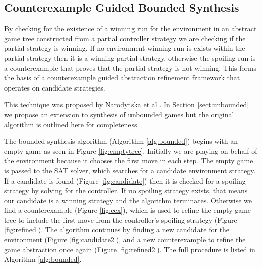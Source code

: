 \documentclass{llncs}
\begin{document}
\subsection{Counterexample Guided Bounded Synthesis}

By checking for the existence of a winning run for the environment in an
abstract game tree constructed from a partial controller strategy we are
checking if the partial strategy is winning. If no environment-winning run is
exists within the partial strategy then it is a winning partial strategy,
otherwise the spoiling run is a counterexample that proves that the partial
strategy is not winning. This forms the basis of a counterexample guided
abstraction refinement framework \cite{clarke2000} that operates on candidate strategies.

This technique was proposed by Narodytska et al \cite{narodytska2014}. In
Section \ref{sect:unbounded} we propose an extension to synthesis of unbounded
games but the original algorithm is outlined here for completeness.

The bounded synthesis algorithm (Algorithm \ref{alg:bounded}) begins with an
empty game as seen in Figure \ref{fig:emptytree}.  Initially we are playing on
behalf of the environment because it chooses the first move in each step.  The
empty game is passed to the SAT solver, which searches for a candidate
environment strategy.  If a candidate is found (Figure \ref{fig:candidate})
then it is checked for a spoiling strategy by solving for the controller.  If
no spoiling strategy exists, that means our candidate is a winning strategy and
the algorithm terminates.  Otherwise we find a counterexample (Figure
\ref{fig:cex}), which is used to refine the empty game tree to include the
first move from the controller's spoiling strategy (Figure \ref{fig:refined}).
The algorithm continues by finding a new candidate for the environment (Figure
\ref{fig:candidate2}), and a new counterexample to refine the game abstraction
once again (Figure \ref{fig:refined2}). The full procedure is listed in
Algorithm \ref{alg:bounded}.
\end{document}
